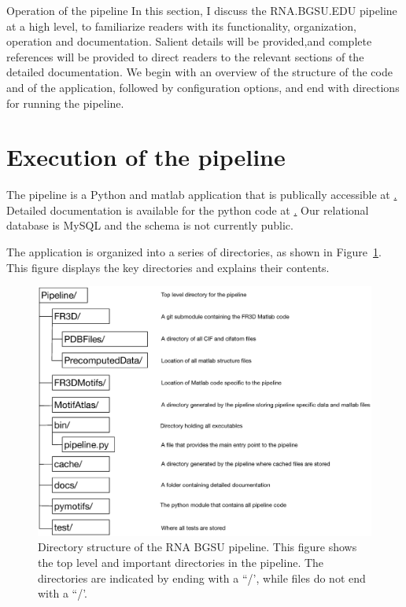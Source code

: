 Operation of the pipeline In this section, I discuss the RNA.BGSU.EDU pipeline
at a high level, to familiarize readers with its functionality, organization,
operation and documentation. Salient details will be provided,and complete
references will be provided to direct readers to the relevant sections of the
detailed documentation. We begin with an overview of the structure of the code
and of the application, followed by configuration options, and end with
directions for running the pipeline.

\section{Execution of the pipeline}

The pipeline is a Python and matlab application that is publically accessible at
\href{https://github.com/BGSU-RNA/RNA-3D-Hub-core}. Detailed documentation is
available for the python code at \href{http://rna-3d-hub-core.readthedocs.io/}.
Our relational database is MySQL and the schema is not currently public.

The application is organized into a series of directories, as shown in
Figure~\ref{fig:pipeline-organization}. This figure displays the key directories
and explains their contents.

\begin{figure}
  \includegraphics[width=\linewidth]{chapter-2/figs/directories}
\caption{Directory structure of the RNA BGSU pipeline. This figure shows the top
level and important directories in the pipeline. The directories are indicated
by ending with a ``/', while files do not end with a ``/'.}
\label{fig:pipeline-organization}
\end{figure}

